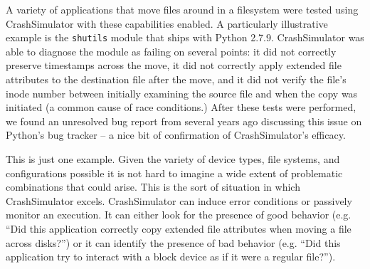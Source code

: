     A variety of applications that move files around in a filesystem were tested using CrashSimulator with these
    capabilities enabled.  A particularly illustrative example is the {\tt shutils} module that ships with Python 2.7.9.
    CrashSimulator was able to diagnose the module as failing on several points: it did not correctly preserve
    timestamps across the move, it did not correctly apply extended file attributes to the destination file after the
    move, and it did not verify the file's inode number between initially examining the source file and when the copy
    was initiated (a common cause of race conditions.)  After these tests were performed, we found an unresolved bug
    report from several years ago discussing this issue on Python's bug tracker -- a nice bit of confirmation of
    CrashSimulator's efficacy.

    This is just one example.  Given the variety of device types, file systems, and configurations possible it is not
    hard to imagine a wide extent of problematic combinations that could arise.  This is the sort of situation in which
    CrashSimulator excels.  CrashSimulator can induce error conditions or passively monitor an execution.  It can
    either look for the presence of good behavior (e.g. ``Did this application correctly copy extended file attributes
    when moving a file across disks?'') or it can identify the presence of bad behavior (e.g. ``Did this application try to
    interact with a block device as if it were a regular file?'').  
